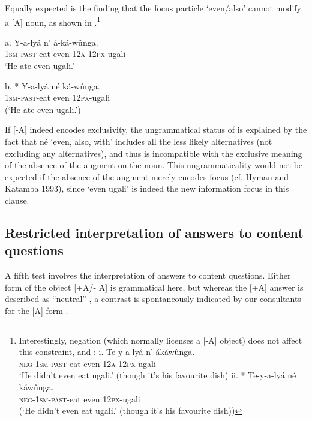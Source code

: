 \documentclass[output=paper]{langsci/langscibook}
\begin{document}
Equally expected is the finding that the focus particle ‘even/also’ cannot modify a [A] noun, as shown in .\footnote{%
  Interestingly, negation (which normally licenses a [-A] object) does not affect this constraint, and :
    \ea
      \ea
      \gll i.  Te-y-a-lyá    n’  ákáwûnga.\\
	\textsc{neg}-\textsc{1sm}-\textsc{past}-eat  even  \textsc{12a}-\textsc{12px}-ugali\\
      \glt   ‘He didn’t even eat ugali.’ (though it’s his favourite dish)
      \ex
      \gll ii.  * Te-y-a-lyá    né  káwûnga.\\
	\textsc{neg}-\textsc{1sm}-\textsc{past}-eat  even  \textsc{12px}-ugali\\
	(‘He didn’t even eat ugali.’ (though it’s his favourite dish))
      \z
    \z
}

\ea
\gll   a.  Y-a-lyá    n’  á-ká-wûnga.\\
         \textsc{1sm}-\textsc{past}-eat  even  \textsc{12a}-\textsc{12px}-ugali\\
\glt     ‘He ate even ugali.’
\z

\ea
\gll   b.  * Y-a-lyá    né  ká-wûnga.\\
         \textsc{1sm}-\textsc{past}-eat  even  \textsc{12px}-ugali\\
\glt     (‘He ate even ugali.’)
\z

If [-A] indeed encodes exclusivity, the ungrammatical status of  is explained by the fact that né ‘even, also, with’ includes all the less likely alternatives (not excluding any alternatives), and thus is incompatible with the exclusive meaning of the absence of the augment on the noun. This ungrammaticality would not be expected if the absence of the augment merely encodes focus (cf. Hyman and Katamba 1993), since ‘even ugali’ is indeed the new information focus in this clause.

\subsection{Restricted interpretation of answers to content questions} %

A fifth test involves the interpretation of answers to content questions. Either form of the object [+A/- A] is grammatical here, but whereas the [+A] answer is described as “neutral” , a contrast is spontaneously indicated by our consultants for the [A] form . 
\end{document}
